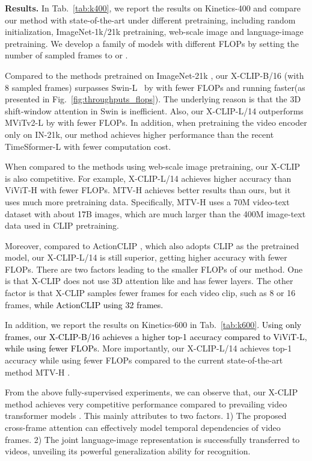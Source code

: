\documentclass[runningheads]{llncs}
\begin{document}
\textbf{Results.} In Tab.~\ref{tab:k400}, we report the results on Kinetics-400 and compare our method with state-of-the-art under different pretraining, including random initialization, ImageNet-1k/21k \cite{deng2009imagenet} pretraining, web-scale image and language-image pretraining. We develop a family of models with different FLOPs by setting the number of sampled frames to  or . 

Compared to the methods pretrained on ImageNet-21k \cite{deng2009imagenet}, our X-CLIP-B/16 (with 8 sampled frames) surpasses Swin-L~\cite{liu2021swin} by  with  fewer FLOPs and running  faster(as presented in Fig.~\ref{fig:throughputs_flops}). The underlying reason is that the 3D shift-window attention in Swin is inefficient. Also, our X-CLIP-L/14 outperforms MViTv2-L \cite{li2021mvitv2} by  with  fewer FLOPs. In addition, when pretraining the video encoder only on IN-21k, our method achieves higher performance than the recent TimeSformer-L \cite{timesformer2021} with fewer computation cost.

When compared to the methods using web-scale image pretraining, our X-CLIP is also competitive. For example, X-CLIP-L/14 achieves  higher accuracy than ViViT-H \cite{arnab2021vivit} with  fewer FLOPs. MTV-H \cite{yan2022multiview} achieves better results than ours, but it uses much more pretraining data. Specifically, MTV-H uses a 70M video-text dataset with about \textcolor{black}{17}B images, which are much larger than the 400M image-text data used in CLIP pretraining.

Moreover, compared to ActionCLIP \cite{wang2021actionclip}, which also adopts CLIP as the pretrained model, our X-CLIP-L/14 is still superior, getting  higher accuracy with fewer FLOPs. There are two factors leading to the smaller FLOPs of our method. One is that X-CLIP does not use 3D attention like \cite{liu2021video} and has fewer layers. The other factor is that X-CLIP samples fewer frames for each video clip, such as 8 or 16 frames, \textcolor{black}{while ActionCLIP \cite{wang2021actionclip} using 32 frames.}

In addition, we report the results on Kinetics-600 in Tab.~\ref{tab:k600}. \textcolor{black}{Using only  frames, our X-CLIP-B/16 achieves a higher top-1 accuracy compared to ViViT-L, while using  fewer FLOPs.}
More importantly, our X-CLIP-L/14 achieves  top-1 accuracy while using  fewer FLOPs compared to the current state-of-the-art method MTV-H \cite{yan2022multiview}. 

From the above fully-supervised experiments, we can observe that, our X-CLIP method achieves very competitive performance compared to prevailing video transformer models \cite{zhang2021co,florence,yan2022multiview,wang2021actionclip,ju2021prompting}. This mainly attributes to two factors.
1) The proposed cross-frame attention can effectively model temporal dependencies of video frames. 2) The joint language-image representation is successfully transferred to videos, unveiling its powerful generalization ability for recognition. 
\end{document}
